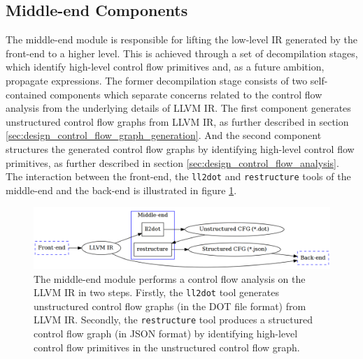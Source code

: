


\subsection{Middle-end Components}
\label{sec:middle-end_components}

The middle-end module is responsible for lifting the low-level IR generated by the front-end to a higher level. This is achieved through a set of decompilation stages, which identify high-level control flow primitives and, as a future ambition, propagate expressions. The former decompilation stage consists of two self-contained components which separate concerns related to the control flow analysis from the underlying details of LLVM IR. The first component generates unstructured control flow graphs from LLVM IR, as further described in section \ref{sec:design_control_flow_graph_generation}. And the second component structures the generated control flow graphs by identifying high-level control flow primitives, as further described in section \ref{sec:design_control_flow_analysis}. The interaction between the front-end, the \texttt{ll2dot} and \texttt{restructure} tools of the middle-end and the back-end is illustrated in figure \ref{fig:middle-end}.

\begin{figure}[htbp]
	\begin{center}
		\includegraphics[width=\textwidth]{inc/middle-end.png}
		\caption{The middle-end module performs a control flow analysis on the LLVM IR in two steps. Firstly, the \texttt{ll2dot} tool generates unstructured control flow graphs (in the DOT file format) from LLVM IR. Secondly, the \texttt{restructure} tool produces a structured control flow graph (in JSON format) by identifying high-level control flow primitives in the unstructured control flow graph.}
		\label{fig:middle-end}
	\end{center}
\end{figure}




